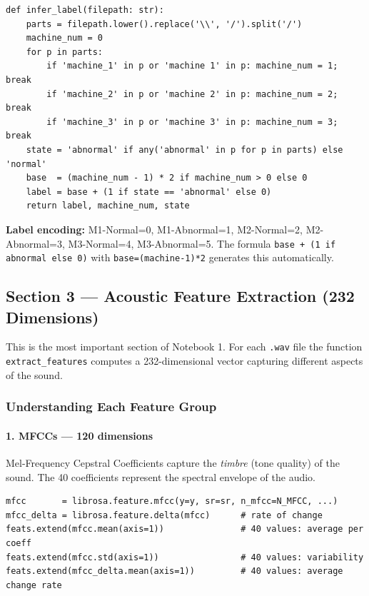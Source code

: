 \documentclass[12pt,a4paper]{article}
\begin{document}
\begin{lstlisting}
def infer_label(filepath: str):
    parts = filepath.lower().replace('\\', '/').split('/')
    machine_num = 0
    for p in parts:
        if 'machine_1' in p or 'machine 1' in p: machine_num = 1; break
        if 'machine_2' in p or 'machine 2' in p: machine_num = 2; break
        if 'machine_3' in p or 'machine 3' in p: machine_num = 3; break
    state = 'abnormal' if any('abnormal' in p for p in parts) else 'normal'
    base  = (machine_num - 1) * 2 if machine_num > 0 else 0
    label = base + (1 if state == 'abnormal' else 0)
    return label, machine_num, state
\end{lstlisting}

\begin{infobox}
\textbf{Label encoding:} M1-Normal=0, M1-Abnormal=1, M2-Normal=2, M2-Abnormal=3, M3-Normal=4, M3-Abnormal=5. The formula \texttt{base + (1 if abnormal else 0)} with \texttt{base=(machine-1)*2} generates this automatically.
\end{infobox}

\subsection{Section 3 --- Acoustic Feature Extraction (232 Dimensions)}

This is the most important section of Notebook 1. For each \texttt{.wav} file the function \texttt{extract\_features} computes a 232-dimensional vector capturing different aspects of the sound.

\subsubsection{Understanding Each Feature Group}

\paragraph{1. MFCCs --- 120 dimensions}
Mel-Frequency Cepstral Coefficients capture the \textit{timbre} (tone quality) of the sound. The 40 coefficients represent the spectral envelope of the audio.

\begin{lstlisting}
mfcc       = librosa.feature.mfcc(y=y, sr=sr, n_mfcc=N_MFCC, ...)
mfcc_delta = librosa.feature.delta(mfcc)      # rate of change
feats.extend(mfcc.mean(axis=1))               # 40 values: average per coeff
feats.extend(mfcc.std(axis=1))                # 40 values: variability
feats.extend(mfcc_delta.mean(axis=1))         # 40 values: average change rate
\end{lstlisting}
\end{document}
